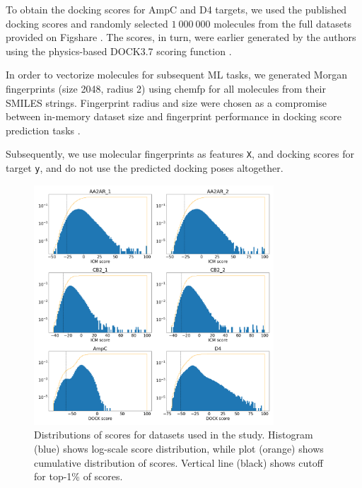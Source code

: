 To obtain the docking scores for AmpC and D4 targets, we used the published docking scores \cite{ultralarge_docking_first} and randomly selected $1\ 000\ 000$ molecules from the full datasets provided on Figshare \cite{ultralarge_docking_first}. The scores, in turn, were earlier generated by the authors using the physics-based DOCK3.7 scoring function \cite{Coleman2013}.

In order to vectorize molecules for subsequent ML tasks, we generated Morgan fingerprints (size 2048, radius 2) using chemfp \cite{Dalke2019} for all molecules from their SMILES strings. Fingerprint radius and size were chosen as a compromise between in-memory dataset size and fingerprint performance in docking score prediction tasks \cite{logistic_regression}.

Subsequently, we use molecular fingerprints as features \texttt{X}, and docking scores for target \texttt{y}, and do not use the predicted docking poses altogether.

\begin{figure}[ht]
\centering
\includegraphics[width=0.8\textwidth]{figures/figure_1_scores_distribution.png}
\caption{Distributions of scores for datasets used in the study. Histogram (blue) shows log-scale score distribution, while plot (orange) shows cumulative distribution of scores. Vertical line (black) shows cutoff for top-1\% of scores.}
\label{fig:fig_1_distribution}
\end{figure}


